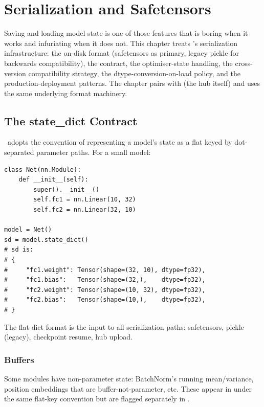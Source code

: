 \chapter{Serialization and Safetensors}
\label{ch:serialization}

Saving and loading model state is one of those features that is
boring when it works and infuriating when it does not. This
chapter treats \Lucid's serialization infrastructure: the
on-disk format (safetensors as primary, legacy pickle for
backwards compatibility), the  contract,
the optimiser-state handling, the cross-version compatibility
strategy, the dtype-conversion-on-load policy, and the
production-deployment patterns. The chapter pairs with
 (the hub itself) and uses the same
underlying format machinery.

\section{The state\_dict Contract}
\label{sec:serialization:state_dict}

\Lucid\ adopts the convention of representing a model's
state as a flat  keyed by dot-separated
parameter paths. For a small model:

\begin{lstlisting}[style=lucid,language=LucidPython]
class Net(nn.Module):
    def __init__(self):
        super().__init__()
        self.fc1 = nn.Linear(10, 32)
        self.fc2 = nn.Linear(32, 10)

model = Net()
sd = model.state_dict()
# sd is:
# {
#     "fc1.weight": Tensor(shape=(32, 10), dtype=fp32),
#     "fc1.bias":   Tensor(shape=(32,),    dtype=fp32),
#     "fc2.weight": Tensor(shape=(10, 32), dtype=fp32),
#     "fc2.bias":   Tensor(shape=(10,),    dtype=fp32),
# }
\end{lstlisting}

The flat-dict format is the input to all serialization paths:
safetensors, pickle (legacy), checkpoint resume, hub upload.

\subsection{Buffers}
\label{ssec:serialization:buffers}

Some modules have non-parameter state: BatchNorm's running
mean/variance, position embeddings that are
buffer-not-parameter, etc. These appear in 
under the same flat-key convention but are flagged separately
in .

